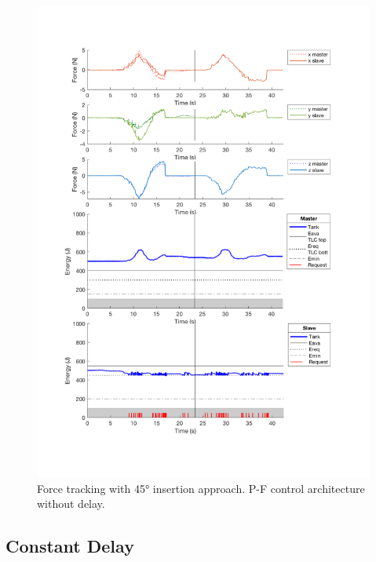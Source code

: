 \begin{center}
	\begin{figure}
		\includegraphics[width=\textwidth, keepaspectratio]{plots/pf45/Force.pdf}
		\caption{Force tracking with 45° insertion approach. P-F control architecture without delay.}
		\label{graph:pf45/Force}
	\end{figure}
\end{center}
\newpage
\subsection{Constant Delay}
